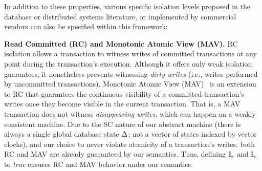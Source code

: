 In addition to these properties, various specific isolation levels
proposed in the database or distributed systems literature, or
implemented by commercial vendors can also be specified within this
framework:

\textbf{Read Committed (RC) and Monotonic Atomic View (MAV).} RC
isolation allows a transaction to witness writes of committed
transactions at any point during the transaction's execution.
Although it offers only weak isolation guarantees, it nonetheless
prevents witnessing \emph{dirty writes} (i.e., writes performed by
uncommitted transactions).  Monotonic Atomic View
(MAV)~\cite{bailishat} is an extension to RC that guarantees the
continuous visibility of a committed transaction's writes once they
become visible in the current transaction. That is, a MAV transaction
does not witness \emph{disappearing writes}, which can happen on a
weakly consistent machine. Due to the SC nature of our abstract
machine (there is always a single global database state $\Delta$; not a
vector of states indexed by vector clocks), and our choice to never
violate atomicity of a transaction's writes, both RC and MAV are
already guaranteed by our semantics.  Thus, defining $\mathbb{I}_e$ and $\mathbb{I}_c$
to \emph{true} ensures RC and MAV behavior under our semantics.


